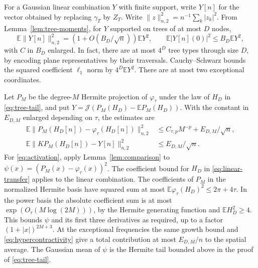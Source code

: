 \documentclass[11pt,letterpaper]{article}
\newcommand{\E}{\mathbb E}
\newcommand{\abs}[1]{\lvert #1\rvert}
\newcommand{\norm}[1]{\lVert #1\rVert}
\begin{document}
For a Gaussian linear combination \(Y\) with finite support, write
\(Y[n]\) for the vector obtained by replacing \(\gamma_T\) by \(Z_T\).
Write \(\|z\|_{n,2}^2=n^{-1}\sum_k\abs{z_k}^2\). From
Lemma~\ref{lem:tree-moments}, for \(Y\) supported on trees of at most
\(D\) nodes,
\begin{equation}\label{eq:linear-transfer}
 \E\norm{Y[n]}_{n,2}^2=(1+O(B_D/\sqrt n))\E Y^2,
 \qquad \E\abs{Y[n](0)}^2\le B_D\E Y^2,
\end{equation}
with \(C\) in \(B_D\) enlarged. In fact, there are at most \(4^D\) tree
types through size \(D\), by encoding plane representatives by their
traversals. Cauchy--Schwarz bounds the squared coefficient \(\ell_1\) norm
by \(4^D\E Y^2\). There are at most two exceptional coordinates.

Let \(P_M\) be the degree-\(M\) Hermite projection of \(\varphi_\tau\) under
the law of \(H_D\) in \eqref{eq:tree-tail}, and put
\(Y=\mathcal J(P_M(H_D)-\E P_M(H_D))\). With the constant in \(E_{D,M}\)
enlarged depending on \(\tau\), the estimates are
\begin{align}
 \E\norm{P_M(H_D[n])-\varphi_\tau(H_D[n])}_{n,2}^2
   &\le C_{\tau,p} M^{-p}+E_{D,M}/\sqrt n, \label{eq:activation}\\
 \E\norm{K P_M(H_D[n])-Y[n]}_{n,2}^2
   &\le E_{D,M}/\sqrt n. \label{eq:grafting}
\end{align}
For \eqref{eq:activation}, apply Lemma~\ref{lem:comparison} to
\(\psi(x)=(P_M(x)-\varphi_\tau(x))^2\). The coefficient bound for \(H_D\) in
\eqref{eq:linear-transfer} applies to the linear combination. The
coefficients of \(P_M\) in the normalized Hermite basis have squared
sum at most \(\E\varphi_\tau(H_D)^2\le2\pi+4\tau\). In the power basis
the absolute coefficient sum is at most
\(\exp(O_\tau(M\log(2M)))\), by the Hermite generating function and
\(\E H_D^2\ge4\). This bounds \(\psi\) and its first three derivatives as
required, up to a factor \((1+\abs x)^{2M+3}\). At the exceptional
frequencies the same growth bound and \eqref{eq:hypercontractivity}
give a total contribution at most \(E_{D,M}/n\) to the spatial
average. The Gaussian mean of \(\psi\) is the Hermite tail bounded above
in the proof of \eqref{eq:tree-tail}.
\end{document}
